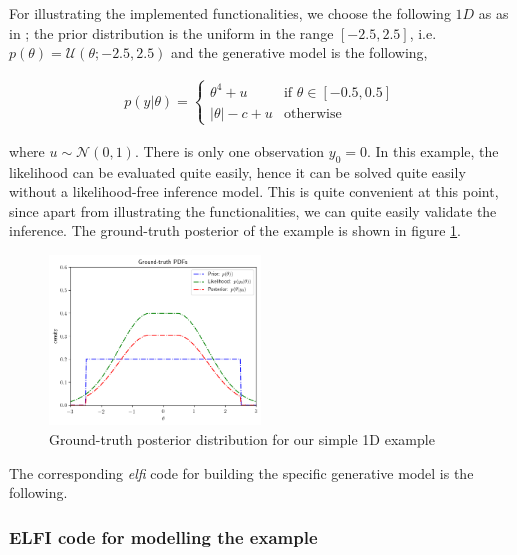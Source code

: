 For illustrating the implemented functionalities, we choose the
following $1D$ as as in
\cite{Ikonomov2019}; the prior distribution is the uniform in the
range $[-2.5, 2.5]$, i.e.\ $p(\theta) = \mathcal{U}(\theta;-2.5,2.5)$
and the generative model is the following,

\begin{gather} \label{eq:1D_example}
  p(y|\theta) = 
  \left\{
    \begin{array}{ll}
      \theta^4 + u & \mbox{if } \theta \in [-0.5, 0.5] \\
      |\theta| - c + u & \mbox{otherwise} 
    \end{array} \right.
\end{gather}

\noindent
where $u \sim \mathcal{N}(0,1)$. There is only one observation
$y_0 = 0$. In this example, the likelihood can be evaluated quite
easily, hence it can be solved quite easily without a likelihood-free
inference model. This is quite convenient at this point, since apart
from illustrating the functionalities, we can quite easily validate
the inference. The ground-truth posterior of the example is shown in
figure \ref{fig:example_gt}.

\begin{figure}[h]
    \begin{center}
      \includegraphics[width=0.5\textwidth]{./Thesis/images/chapter3/example_gt.png}
    \end{center}
  \caption{Ground-truth posterior distribution for our simple 1D example}
  \label{fig:example_gt}
\end{figure}

The corresponding \textit{elfi} code for building the specific generative model is the following.

\subsubsection*{ELFI code for modelling the example}

